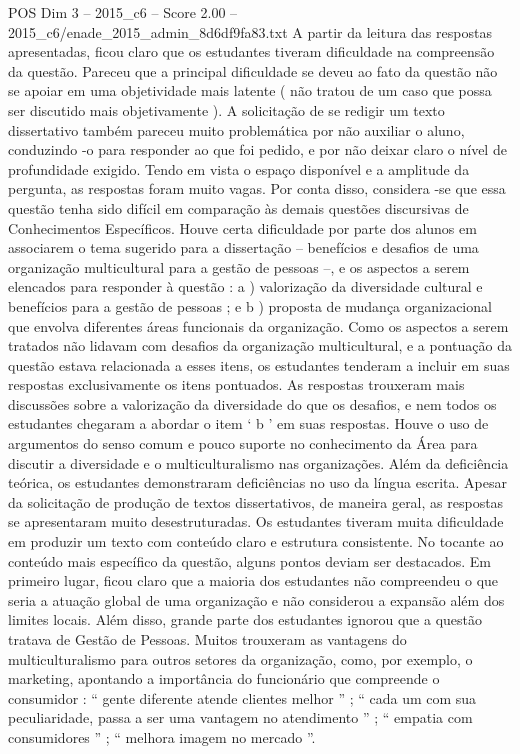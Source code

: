 \begin{textsample}{POS Dim 3 – 2015\_c6 – Score 2.00 – 2015\_c6/enade\_2015\_admin\_8d6df9fa83.txt}
A partir da leitura das respostas apresentadas, ficou claro que os estudantes tiveram dificuldade na compreensão da questão.
Pareceu que a principal dificuldade se deveu ao fato da questão não se apoiar em uma objetividade mais latente ( não tratou de um caso que possa ser discutido mais objetivamente ).
A solicitação de se redigir um texto dissertativo também pareceu muito problemática por não auxiliar o aluno, conduzindo -o para responder ao que foi pedido, e por não deixar claro o nível de profundidade exigido.
Tendo em vista o espaço disponível e a amplitude da pergunta, as respostas foram muito vagas.
Por conta disso, considera -se que essa questão tenha sido difícil em comparação às demais questões discursivas de Conhecimentos Específicos.
Houve certa dificuldade por parte dos alunos em associarem o tema sugerido para a dissertação – benefícios e desafios de uma organização multicultural para a gestão de pessoas –, e os aspectos a serem elencados para responder à questão : a ) valorização da diversidade cultural e benefícios para a gestão de pessoas ; e b ) proposta de mudança organizacional que envolva diferentes áreas funcionais da organização.
Como os aspectos a serem tratados não lidavam com desafios da organização multicultural, e a pontuação da questão estava relacionada a esses itens, os estudantes tenderam a incluir em suas respostas exclusivamente os itens pontuados.
As respostas trouxeram mais discussões sobre a valorização da diversidade do que os desafios, e nem todos os estudantes chegaram a abordar o item ‘ b ’ em suas respostas.
Houve o uso de argumentos do senso comum e pouco suporte no conhecimento da Área para discutir a diversidade e o multiculturalismo nas organizações.
Além da deficiência teórica, os estudantes demonstraram deficiências no uso da língua escrita.
Apesar da solicitação de produção de textos dissertativos, de maneira geral, as respostas se apresentaram muito desestruturadas.
Os estudantes tiveram muita dificuldade em produzir um texto com conteúdo claro e estrutura consistente.
No tocante ao conteúdo mais específico da questão, alguns pontos deviam ser destacados.
Em primeiro lugar, ficou claro que a maioria dos estudantes não compreendeu o que seria a atuação global de uma organização e não considerou a expansão além dos limites locais.
Além disso, grande parte dos estudantes ignorou que a questão tratava de Gestão de Pessoas.
Muitos trouxeram as vantagens do multiculturalismo para outros setores da organização, como, por exemplo, o marketing, apontando a importância do funcionário que compreende o consumidor : “ gente diferente atende clientes melhor ” ; “ cada um com sua peculiaridade, passa a ser uma vantagem no atendimento ” ; “ empatia com consumidores ” ; “ melhora imagem no mercado ”.

\end{textsample}
